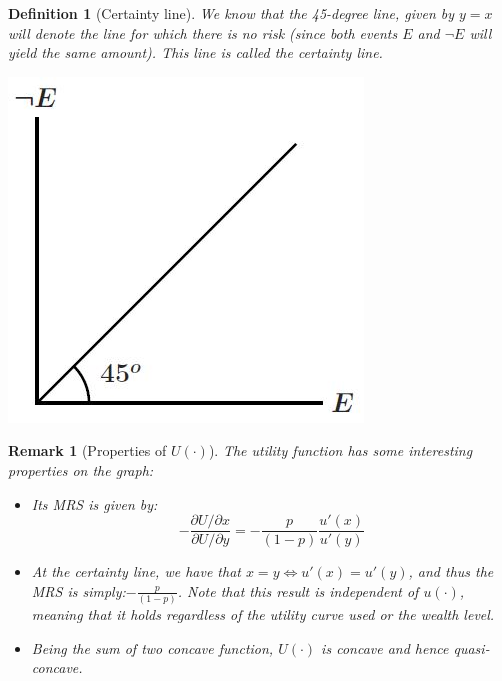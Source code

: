 \documentclass[12pt]{report}
\newtheorem{definition}{Definition}[chapter]
\newtheorem{remark}{Remark}[chapter]
\begin{document}
\begin{minipage}{0.69\textwidth}
\begin{definition}[Certainty line]
We know that the 45-degree line, given by $y=x$ will denote the line for which there is no risk (since both events $E$ and $\neg E$ will yield the same amount). This line is called the certainty line.
\end{definition}
\end{minipage}
\begin{minipage}{0.29\textwidth}
\centering
\includegraphics[scale=0.35]{images/certline}
\end{minipage} \hfill

\begin{remark}[Properties of $U(\cdot)$]
The utility function has some interesting properties on the graph:\begin{itemize}
\item Its MRS is given by: $$ -\frac{\partial U/\partial x}{\partial U/\partial y} = -\frac{p}{(1-p)}\frac{u'(x)}{u'(y)}$$
\item At the certainty line, we have that $x = y\Leftrightarrow u'(x) = u'(y)$, and thus the MRS is simply:$-\frac{p}{(1-p)}$. Note that this result is independent of $u(\cdot)$, meaning that it holds regardless of the utility curve used or the wealth level.
\item Being the sum of two concave function, $U(\cdot)$ is concave and hence quasi-concave.
\end{itemize}
\end{remark}
\end{document}
